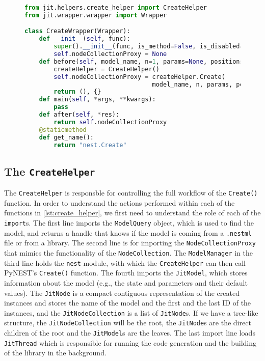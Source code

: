 \begin{figure}[ht!]
    \centering
    \begin{lstlisting}[language=Python, label=lst:create_wrapper, caption={The \texttt{CreateWrapper}}]
from jit.helpers.create_helper import CreateHelper
from jit.wrapper.wrapper import Wrapper

class CreateWrapper(Wrapper):
    def __init__(self, func):
        super().__init__(func, is_method=False, is_disabled=False)
        self.nodeCollectionProxy = None
    def before(self, model_name, n=1, params=None, positions=None):
        createHelper = CreateHelper()
        self.nodeCollectionProxy = createHelper.Create(
                                   model_name, n, params, positions)
        return (), {}
    def main(self, *args, **kwargs):
        pass
    def after(self, *res):
        return self.nodeCollectionProxy
    @staticmethod
    def get_name():
        return "nest.Create"
\end{lstlisting}
\end{figure}

\subsection{The \texttt{CreateHelper}}

The \texttt{CreateHelper} is responsble for controlling the full workflow of the \texttt{Create()} function. In order to understand the actions performed within each of the functions in \autoref{lst:create_helper}, we first need to understand the role of each of the \texttt{import}s. The first line imports the \texttt{ModelQuery} object, which is used to find the model, and returns a handle that knows if the model is coming from a \texttt{.nestml} file or from a library. The second line is for importing the \texttt{NodeCollectionProxy} that mimics the functionality of the \texttt{NodeCollection}. The \texttt{ModelManager} in the third line holds the \texttt{nest} module, with which the \texttt{CreateHelper} can then call PyNEST's \texttt{Create()} function. The fourth imports the \texttt{JitModel}, which stores information about the model (e.g., the state and parameters and their default values). The \texttt{JitNode} is a compact contiguous representation of the created instances and stores the name of the model and the first and the last ID of the instances, and the \texttt{JitNodeCollection} is a list of \texttt{JitNode}s. If we have a tree-like structure, the \texttt{JitNodeCollection} will be the root, the \texttt{JitNode}s are the direct children of the root and the \texttt{JitModel}s are the leaves. The last import line loads \texttt{JitThread} which is responsible for running the code generation and the building of the library in the background.

